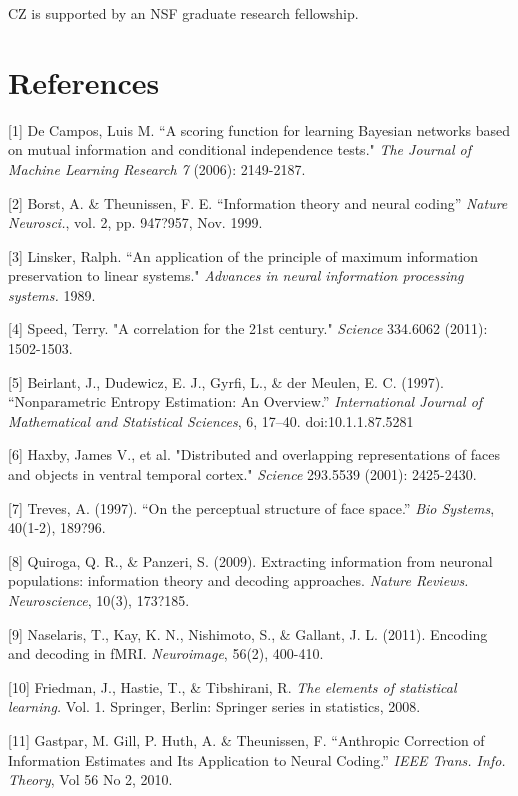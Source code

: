 \documentclass{article}
\begin{document}
CZ is supported by an NSF graduate research fellowship.

\section*{References}

\small

[1] De Campos, Luis M. ``A scoring function for learning Bayesian networks
based on mutual information and conditional independence tests." \emph{The
Journal of Machine Learning Research 7} (2006): 2149-2187.

[2] Borst, A. \& Theunissen, F. E. ``Information theory and neural coding''
\emph{Nature Neurosci.}, vol. 2, pp. 947?957, Nov. 1999.

[3] Linsker, Ralph. ``An application of the principle of maximum
information preservation to linear systems." \emph{Advances in neural
information processing systems.} 1989.

[4] Speed, Terry. "A correlation for the 21st century." \emph{Science}
334.6062 (2011): 1502-1503.

[5] Beirlant, J., Dudewicz, E. J., Gyrfi, L., \& der Meulen,
E. C. (1997). ``Nonparametric Entropy Estimation: An
Overview.'' \emph{International Journal of Mathematical and Statistical
Sciences}, 6, 17–40. doi:10.1.1.87.5281

[6] Haxby, James V., et al. "Distributed and overlapping representations of faces and objects in ventral temporal cortex." \emph{Science} 293.5539 (2001): 2425-2430.

[7] Treves, A. (1997). ``On the perceptual structure of face space.'' \emph{Bio Systems}, 40(1-2), 189?96. 

[8] Quiroga, Q. R., \& Panzeri, S. (2009). Extracting information from neuronal populations: information theory and decoding approaches. \emph{Nature Reviews. Neuroscience}, 10(3), 173?185.

[9] Naselaris, T., Kay, K. N., Nishimoto, S., \& Gallant,
J. L. (2011). Encoding and decoding in fMRI. \emph{Neuroimage}, 56(2),
400-410.

[10] Friedman, J., Hastie, T., \& Tibshirani, R. \emph{The elements
of statistical learning.} Vol. 1. Springer, Berlin: Springer series in
statistics, 2008.

[11] Gastpar, M.  Gill, P.  Huth, A. \& Theunissen, F. ``Anthropic
Correction of Information Estimates and Its Application to Neural
Coding.'' \emph{IEEE Trans. Info. Theory}, Vol 56 No 2, 2010.
\end{document}
